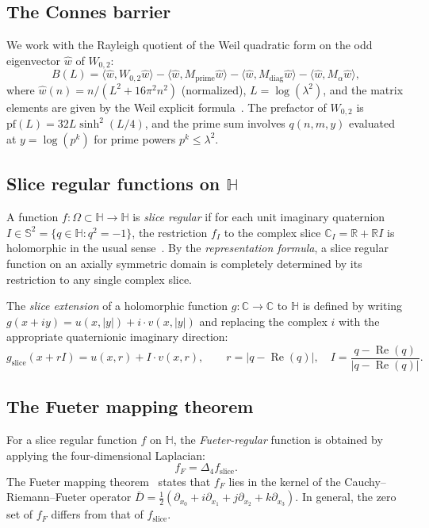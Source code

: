 \documentclass[11pt,a4paper]{article}
\theoremstyle{definition}
\DeclareMathOperator{\re}{Re}
\begin{document}
\subsection{The Connes barrier}

We work with the Rayleigh quotient of the Weil quadratic form on the odd eigenvector $\hat{w}$ of $W_{0,2}$:
\begin{equation}\label{eq:barrier}
B(L) = \langle \hat{w}, W_{0,2} \hat{w} \rangle - \langle \hat{w}, M_{\mathrm{prime}} \hat{w} \rangle - \langle \hat{w}, M_{\mathrm{diag}} \hat{w} \rangle - \langle \hat{w}, M_\alpha \hat{w} \rangle,
\end{equation}
where $\hat{w}(n) = n/(L^2 + 16\pi^2 n^2)$ (normalized), $L = \log(\lambda^2)$, and the matrix elements are given by the Weil explicit formula~\cite{CCM2025}. The prefactor of $W_{0,2}$ is $\mathrm{pf}(L) = 32L\sinh^2(L/4)$, and the prime sum involves $q(n,m,y)$ evaluated at $y = \log(p^k)$ for prime powers $p^k \le \lambda^2$.

\subsection{Slice regular functions on $\mathbb{H}$}

A function $f: \Omega \subset \mathbb{H} \to \mathbb{H}$ is \emph{slice regular} if for each unit imaginary quaternion $I \in \mathbb{S}^2 = \{q \in \mathbb{H}: q^2 = -1\}$, the restriction $f_I$ to the complex slice $\mathbb{C}_I = \mathbb{R} + \mathbb{R}I$ is holomorphic in the usual sense~\cite{GentiliStoppato2023}. By the \emph{representation formula}, a slice regular function on an axially symmetric domain is completely determined by its restriction to any single complex slice.

The \emph{slice extension} of a holomorphic function $g: \mathbb{C} \to \mathbb{C}$ to $\mathbb{H}$ is defined by writing $g(x+iy) = u(x,|y|) + i \cdot v(x,|y|)$ and replacing the complex $i$ with the appropriate quaternionic imaginary direction:
\[
g_{\mathrm{slice}}(x + rI) = u(x,r) + I \cdot v(x,r), \qquad r = |q - \re(q)|, \quad I = \frac{q - \re(q)}{|q - \re(q)|}.
\]

\subsection{The Fueter mapping theorem}

For a slice regular function $f$ on $\mathbb{H}$, the \emph{Fueter-regular} function is obtained by applying the four-dimensional Laplacian:
\[
f_F = \Delta_4 f_{\mathrm{slice}}.
\]
The Fueter mapping theorem~\cite{Fueter1935,Sce1957} states that $f_F$ lies in the kernel of the Cauchy--Riemann--Fueter operator $\bar{D} = \frac{1}{2}(\partial_{x_0} + i\partial_{x_1} + j\partial_{x_2} + k\partial_{x_3})$. In general, the zero set of $f_F$ differs from that of $f_{\mathrm{slice}}$.
\end{document}
